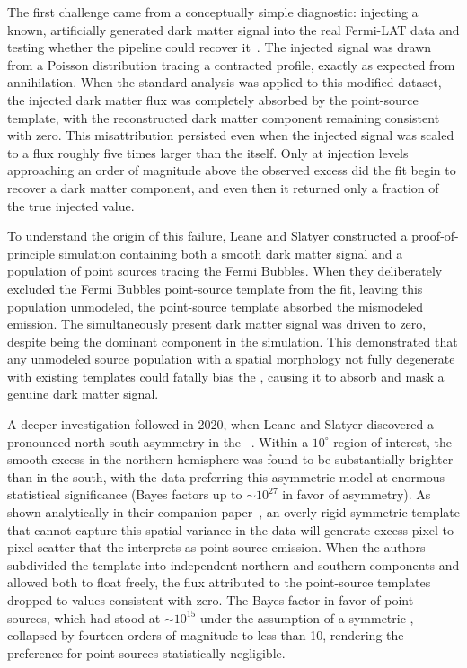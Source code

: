 The first challenge came from a conceptually simple diagnostic: injecting a known, artificially generated dark matter signal into the real Fermi-LAT data and testing whether the \NPTF pipeline could recover it~\cite{Leane:2019xiy}.
The injected signal was drawn from a Poisson distribution tracing a contracted \NFW profile, exactly as expected from \WIMP annihilation.
When the standard \NPTF analysis was applied to this modified dataset, the injected dark matter flux was completely absorbed by the \NFW point-source template, with the reconstructed dark matter component remaining consistent with zero.
This misattribution persisted even when the injected signal was scaled to a flux roughly five times larger than the \GCE itself.
Only at injection levels approaching an order of magnitude above the observed excess did the fit begin to recover a dark matter component, and even then it returned only a fraction of the true injected value.

To understand the origin of this failure, Leane and Slatyer constructed a proof-of-principle simulation containing both a smooth dark matter signal and a population of point sources tracing the Fermi Bubbles.
When they deliberately excluded the Fermi Bubbles point-source template from the fit, leaving this population unmodeled, the \NFW point-source template absorbed the mismodeled emission.
The simultaneously present dark matter signal was driven to zero, despite being the dominant component in the simulation.
This demonstrated that any unmodeled source population with a spatial morphology not fully degenerate with existing templates could fatally bias the \NPTF, causing it to absorb and mask a genuine dark matter signal.

A deeper investigation followed in 2020, when Leane and Slatyer discovered a pronounced north-south asymmetry in the \GCE~\cite{Leane:2020nmi,Leane:2020pfc}.
Within a $10^\circ$ region of interest, the smooth excess in the northern hemisphere was found to be substantially brighter than in the south, with the data preferring this asymmetric model at enormous statistical significance (Bayes factors up to $\sim 10^{27}$ in favor of asymmetry).
As shown analytically in their companion paper~\cite{Leane:2020pfc}, an overly rigid symmetric template that cannot capture this spatial variance in the data will generate excess pixel-to-pixel scatter that the \NPTF interprets as point-source emission.
When the authors subdivided the \GCE template into independent northern and southern components and allowed both to float freely, the flux attributed to the point-source templates dropped to values consistent with zero.
The Bayes factor in favor of point sources, which had stood at $\sim 10^{15}$ under the assumption of a symmetric \GCE, collapsed by fourteen orders of magnitude to less than 10, rendering the preference for point sources statistically negligible.

